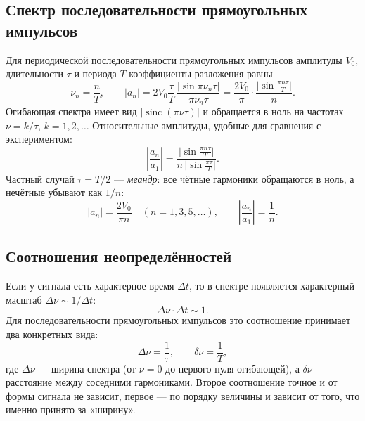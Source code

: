 \documentclass[a4paper,12pt]{article}
\begin{document}
\subsection{Спектр последовательности прямоугольных импульсов}
Для периодической последовательности прямоугольных импульсов амплитуды
$V_0$, длительности $\tau$ и периода $T$ коэффициенты разложения равны
\begin{equation}
    \label{eq:rect_spectrum}
    \nu_n = \frac{n}{T},
    \qquad
    |a_n| = 2V_0\frac{\tau}{T}\,\frac{|\sin \pi\nu_n\tau|}{\pi\nu_n\tau}
    = \frac{2V_0}{\pi}\cdot\frac{\bigl|\sin\frac{\pi n\tau}{T}\bigr|}{n}.
\end{equation}
Огибающая спектра имеет вид $|\operatorname{sinc}(\pi\nu\tau)|$ и обращается в
ноль на частотах $\nu = k/\tau$, $k=1,2,\dots$ Относительные амплитуды,
удобные для сравнения с экспериментом:
\begin{equation}
    \label{eq:rect_ratio}
    \left|\frac{a_n}{a_1}\right|
    = \frac{\bigl|\sin\frac{\pi n \tau}{T}\bigr|}
           {n\,\bigl|\sin\frac{\pi\tau}{T}\bigr|}.
\end{equation}
Частный случай $\tau = T/2$ --- \emph{меандр}: все чётные гармоники
обращаются в ноль, а нечётные убывают как $1/n$:
\begin{equation}
    \label{eq:meander}
    |a_n| = \frac{2V_0}{\pi n}\quad (n = 1, 3, 5, \dots),
    \qquad
    \left|\frac{a_n}{a_1}\right| = \frac1n.
\end{equation}

\subsection{Соотношения неопределённостей}
Если у сигнала есть характерное время $\Delta t$, то в спектре появляется
характерный масштаб $\Delta\nu\sim 1/\Delta t$:
\begin{equation}
    \label{eq:uncertainty}
    \Delta\nu\cdot\Delta t \sim 1.
\end{equation}
Для последовательности прямоугольных импульсов это соотношение принимает два
конкретных вида:
\begin{equation}
    \label{eq:uncertainty_rect}
    \Delta\nu = \frac{1}{\tau},
    \qquad
    \delta\nu = \frac{1}{T},
\end{equation}
где $\Delta\nu$ --- ширина спектра (от $\nu=0$ до первого нуля огибающей),
а $\delta\nu$ --- расстояние между соседними гармониками. Второе соотношение
точное и от формы сигнала не зависит, первое --- по порядку величины и
зависит от того, что именно принято за «ширину».
\end{document}
